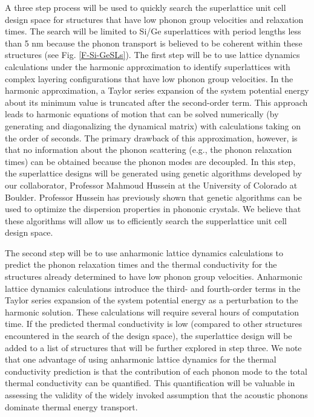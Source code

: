 \documentclass[letterpaper,12pt]{article}
\begin{document}
A three step process will be used to quickly search the superlattice
unit cell design space for structures that have low phonon group
velocities and relaxation times. The search will be limited to Si/Ge
superlattices with period lengths less than 5 nm because the phonon
transport is believed to be coherent within these structures (see
Fig. \ref{F-Si-GeSLs}). The first step will be to use lattice
dynamics calculations under the harmonic approximation to identify
superlattices with complex layering configurations that have low
phonon group velocities. In the harmonic approximation, a Taylor
series expansion of the system potential energy about its minimum
value is truncated after the second-order
term.\cite{dove,mcgaughey2006} This approach leads to harmonic
equations of motion that can be solved numerically (by generating
and diagonalizing the dynamical matrix) with calculations taking on
the order of seconds. The primary drawback of this approximation,
however, is that no information about the phonon scattering (e.g.,
the phonon relaxation times) can be obtained because the phonon
modes are decoupled. In this step, the superlattice designs will be
generated using genetic algorithms developed by our
collaborator,\cite{landry2008a,mcgaughey2006} Professor Mahmoud
Hussein at the University of Colorado at Boulder. Professor Hussein
has previously shown that genetic algorithms can be used to optimize
the dispersion properties in phononic crystals\cite{hussein2006}. We
believe that these algorithms will allow us to efficiently search
the supperlattice unit cell design space.

The second step will be to use anharmonic lattice dynamics
calculations to predict the phonon relaxation times and the thermal
conductivity for the structures already determined to have low
phonon group velocities. Anharmonic lattice dynamics calculations
introduce the third- and fourth-order terms in the Taylor series
expansion of the system potential energy as a perturbation to the
harmonic solution.\cite{turney2008} These calculations will require
several hours of computation time. If the predicted thermal
conductivity is low (compared to other structures encountered in the
search of the design space), the superlattice design will be added
to a list of structures that will be further explored in step three.
We note that one advantage of using anharmonic lattice dynamics for
the thermal conductivity prediction is that the contribution of each
phonon mode to the total thermal conductivity can be
quantified.\cite{turney2008} This quantification will be valuable in
assessing the validity of the widely invoked assumption that the
acoustic phonons dominate thermal energy
transport.\cite{chen1998b,zeng2001,chen2003,ziambaras2006}
\end{document}
